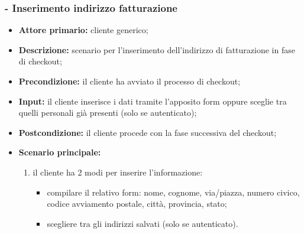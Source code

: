 \subsubsection{ - Inserimento indirizzo fatturazione}
\begin{itemize}
    \item \textbf{Attore primario:} cliente generico;
    \item \textbf{Descrizione:} scenario per l'inserimento dell'indirizzo di fatturazione in fase di checkout;
    \item \textbf{Precondizione:} il cliente ha avviato il processo di checkout;
    \item \textbf{Input:} il cliente inserisce i dati tramite l'apposito form oppure sceglie tra quelli personali già presenti (solo se autenticato);
    \item \textbf{Postcondizione:} il cliente procede con la fase successiva del checkout;
    \item \textbf{Scenario principale:}
          \begin{enumerate}
              \item il cliente ha 2 modi per inserire l'informazione:
                    \begin{itemize}
                        \item compilare il relativo form: nome, cognome, via/piazza, numero civico, codice avviamento postale, città, provincia, stato;
                        \item scegliere tra gli indirizzi salvati (solo se autenticato).
                    \end{itemize}
          \end{enumerate}
\end{itemize}

\stepsubUserCase
